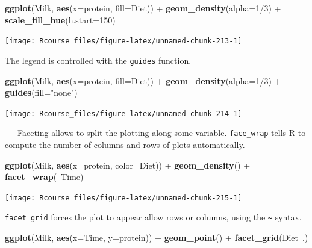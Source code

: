 \documentclass[]{book}
\newenvironment{Shaded}{\begin{snugshade}}{\end{snugshade}}
\newcommand{\KeywordTok}[1]{\textcolor[rgb]{0.13,0.29,0.53}{\textbf{{#1}}}}
\newcommand{\DataTypeTok}[1]{\textcolor[rgb]{0.13,0.29,0.53}{{#1}}}
\newcommand{\DecValTok}[1]{\textcolor[rgb]{0.00,0.00,0.81}{{#1}}}
\newcommand{\StringTok}[1]{\textcolor[rgb]{0.31,0.60,0.02}{{#1}}}
\newcommand{\NormalTok}[1]{{#1}}
\theoremstyle{definition}
\theoremstyle{definition}
\theoremstyle{remark}
\begin{document}
\begin{Shaded}
\begin{Highlighting}[]
\KeywordTok{ggplot}\NormalTok{(Milk, }\KeywordTok{aes}\NormalTok{(}\DataTypeTok{x=}\NormalTok{protein, }\DataTypeTok{fill=}\NormalTok{Diet)) +}
\StringTok{  }\KeywordTok{geom_density}\NormalTok{(}\DataTypeTok{alpha=}\DecValTok{1}\NormalTok{/}\DecValTok{3}\NormalTok{) +}
\StringTok{  }\KeywordTok{scale_fill_hue}\NormalTok{(}\DataTypeTok{h.start=}\DecValTok{150}\NormalTok{)}
\end{Highlighting}
\end{Shaded}

\texttt{[image: Rcourse\_files/figure-latex/unnamed-chunk-213-1]}

The legend is controlled with the \texttt{guides} function.

\begin{Shaded}
\begin{Highlighting}[]
\KeywordTok{ggplot}\NormalTok{(Milk, }\KeywordTok{aes}\NormalTok{(}\DataTypeTok{x=}\NormalTok{protein, }\DataTypeTok{fill=}\NormalTok{Diet)) +}
\StringTok{  }\KeywordTok{geom_density}\NormalTok{(}\DataTypeTok{alpha=}\DecValTok{1}\NormalTok{/}\DecValTok{3}\NormalTok{) +}
\StringTok{  }\KeywordTok{guides}\NormalTok{(}\DataTypeTok{fill=}\StringTok{"none"}\NormalTok{)}
\end{Highlighting}
\end{Shaded}

\texttt{[image: Rcourse\_files/figure-latex/unnamed-chunk-214-1]}

\_\_Faceting allows to split the plotting along some variable.
\texttt{face\_wrap} tells R to compute the number of columns and rows of
plots automatically.

\begin{Shaded}
\begin{Highlighting}[]
\KeywordTok{ggplot}\NormalTok{(Milk, }\KeywordTok{aes}\NormalTok{(}\DataTypeTok{x=}\NormalTok{protein, }\DataTypeTok{color=}\NormalTok{Diet)) +}
\StringTok{  }\KeywordTok{geom_density}\NormalTok{() +}
\StringTok{  }\KeywordTok{facet_wrap}\NormalTok{(~Time)}
\end{Highlighting}
\end{Shaded}

\texttt{[image: Rcourse\_files/figure-latex/unnamed-chunk-215-1]}

\texttt{facet\_grid} forces the plot to appear allow rows or columns,
using the \texttt{\textasciitilde{}} syntax.

\begin{Shaded}
\begin{Highlighting}[]
\KeywordTok{ggplot}\NormalTok{(Milk, }\KeywordTok{aes}\NormalTok{(}\DataTypeTok{x=}\NormalTok{Time, }\DataTypeTok{y=}\NormalTok{protein)) +}
\StringTok{  }\KeywordTok{geom_point}\NormalTok{() +}
\StringTok{  }\KeywordTok{facet_grid}\NormalTok{(Diet~.)}
\end{Highlighting}
\end{Shaded}
\end{document}
